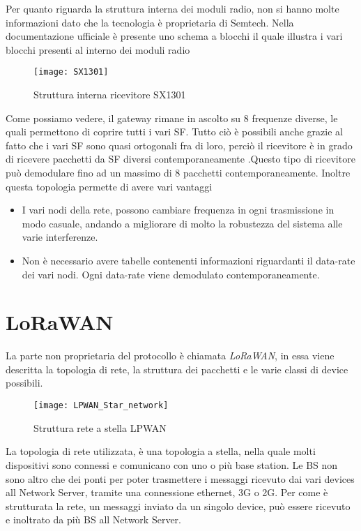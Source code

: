 Per quanto riguarda la struttura interna dei moduli radio, non si hanno molte
informazioni dato che la tecnologia è proprietaria di Semtech. Nella
documentazione ufficiale è presente uno schema a blocchi il quale illustra i
vari blocchi presenti al interno dei moduli radio
\begin{figure}[h]
\centering 
\texttt{[image: SX1301]}
\caption{Struttura interna ricevitore SX1301}
\end{figure}
Come possiamo vedere, il gateway rimane in ascolto su 8 frequenze diverse, le
quali permettono di coprire tutti i vari SF. Tutto ciò è possibili anche grazie
al fatto che i vari SF sono quasi ortogonali fra di loro, perciò il ricevitore è
in grado di ricevere pacchetti da SF diversi contemporaneamente .Questo tipo di ricevitore può
demodulare fino ad un massimo di 8 pacchetti contemporaneamente. Inoltre questa
topologia permette di avere vari vantaggi
\begin{itemize}
\item I vari nodi della rete, possono cambiare frequenza in ogni trasmissione in
modo casuale, andando a migliorare di molto la robustezza del sistema alle varie
interferenze.
\item Non è necessario avere tabelle contenenti informazioni riguardanti il
data-rate dei vari nodi. Ogni data-rate viene demodulato contemporaneamente.
\end{itemize}
\section{LoRaWAN}
La parte non proprietaria del protocollo è chiamata \emph{LoRaWAN}, in essa
viene descritta la topologia di rete, la struttura dei pacchetti e le varie
classi di device possibili.

\begin{figure}[h]
\centering 
\texttt{[image: LPWAN\_Star\_network]}
\caption{Struttura rete a stella LPWAN}
\end{figure}

La topologia di rete utilizzata, è una topologia a stella, nella quale molti
dispositivi sono connessi e comunicano con uno o più base station. Le BS non
sono altro che dei ponti per poter trasmettere i messaggi ricevuto dai vari
devices all Network Server, tramite una connessione ethernet, 3G o 2G. 
Per come è strutturata la rete, un messaggi inviato
da un singolo device, può essere ricevuto e inoltrato da più BS all Network
Server.


